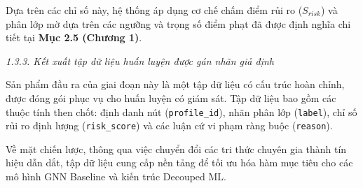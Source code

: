 Dựa trên các chỉ số này, hệ thống áp dụng cơ chế chấm điểm rủi ro ($S_{risk}$) và phân lớp mờ dựa trên các ngưỡng và trọng số điểm phạt đã được định nghĩa chi tiết tại \textbf{Mục 2.5 (Chương 1)}.\vspace{0.3cm}

\textit{1.3.3. Kết xuất tập dữ liệu huấn luyện được gán nhãn giả định}\vspace{0.2cm}

Sản phẩm đầu ra của giai đoạn này là một tập dữ liệu có cấu trúc hoàn chỉnh, được đóng gói phục vụ cho huấn luyện có giám sát. Tập dữ liệu bao gồm các thuộc tính then chốt: định danh nút (\texttt{profile\_id}), nhãn phân lớp (\texttt{label}), chỉ số rủi ro định lượng (\texttt{risk\_score}) và các luận cứ vi phạm ràng buộc (\texttt{reason}).\vspace{0.3cm}

Về mặt chiến lược, thông qua việc chuyển đổi các tri thức chuyên gia thành tín hiệu dẫn dắt, tập dữ liệu cung cấp nền tảng để tối ưu hóa hàm mục tiêu cho các mô hình GNN Baseline và kiến trúc Decouped ML.